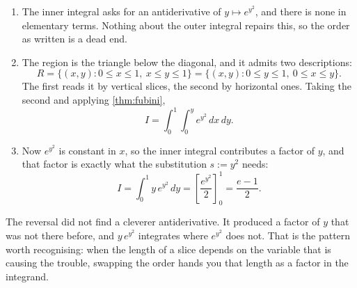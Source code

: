 \begin{exercisesolution}
\label{sol:ai_order_swap_gaussian}
\begin{enumerate}[label=\textbf{(\alph*)}]
  \item The inner integral asks for an antiderivative of $y \mapsto e^{y^2}$, and there is
    none in elementary terms. Nothing about the outer integral repairs this, so the order as
    written is a dead end.
  \item The region is the triangle below the diagonal, and it admits two descriptions:
    \[R = \{(x,y) : 0 \leq x \leq 1,\ x \leq y \leq 1\}
        = \{(x,y) : 0 \leq y \leq 1,\ 0 \leq x \leq y\}.\]
    The first reads it by vertical slices, the second by horizontal ones. Taking the second and
    applying \cref{thm:fubini},
    \[I = \int_0^1\!\!\int_0^{y} e^{y^2}\,dx\,dy.\]
  \item Now $e^{y^2}$ is constant in $x$, so the inner integral contributes a factor of $y$,
    and that factor is exactly what the substitution $s := y^2$ needs:
    \[I = \int_0^1 y\,e^{y^2}\,dy = \left[\frac{e^{y^2}}{2}\right]_0^1 = \frac{e-1}{2}.\]
\end{enumerate}

\begin{remark}
\label{rem:order_swap_supplies_the_factor}
The reversal did not find a cleverer antiderivative. It produced a factor of $y$ that was not
there before, and $y\,e^{y^2}$ integrates where $e^{y^2}$ does not. That is the pattern worth
recognising: when the length of a slice depends on the variable that is causing the trouble,
swapping the order hands you that length as a factor in the integrand.
\end{remark}
\end{exercisesolution}

